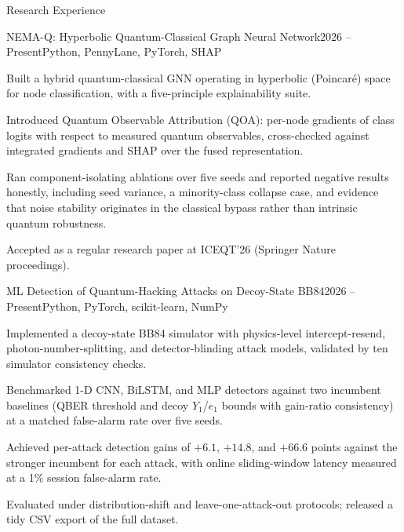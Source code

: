 \documentclass{resume} %
\begin{document}
\begin{rSection}{Research Experience}

\begin{rSubsection}{NEMA-Q: Hyperbolic Quantum-Classical Graph Neural Network}{2026 – Present}{Python, PennyLane, PyTorch, SHAP}{}
\item Built a hybrid quantum-classical GNN operating in hyperbolic (Poincar\'e) space for node classification, with a five-principle explainability suite.
\item Introduced Quantum Observable Attribution (QOA): per-node gradients of class logits with respect to measured quantum observables, cross-checked against integrated gradients and SHAP over the fused representation.
\item Ran component-isolating ablations over five seeds and reported negative results honestly, including seed variance, a minority-class collapse case, and evidence that noise stability originates in the classical bypass rather than intrinsic quantum robustness.
\item Accepted as a regular research paper at ICEQT'26 (Springer Nature proceedings).
\end{rSubsection}
\vspace{.1cm}

\begin{rSubsection}{ML Detection of Quantum-Hacking Attacks on Decoy-State BB84}{2026 – Present}{Python, PyTorch, scikit-learn, NumPy}{}
\item Implemented a decoy-state BB84 simulator with physics-level intercept-resend, photon-number-splitting, and detector-blinding attack models, validated by ten simulator consistency checks.
\item Benchmarked 1-D CNN, BiLSTM, and MLP detectors against two incumbent baselines (QBER threshold and decoy $Y_1$/$e_1$ bounds with gain-ratio consistency) at a matched false-alarm rate over five seeds.
\item Achieved per-attack detection gains of $+6.1$, $+14.8$, and $+66.6$ points against the stronger incumbent for each attack, with online sliding-window latency measured at a 1\% session false-alarm rate.
\item Evaluated under distribution-shift and leave-one-attack-out protocols; released a tidy CSV export of the full dataset.
\end{rSubsection}
\vspace{.1cm}


\end{rSection}
\end{document}
